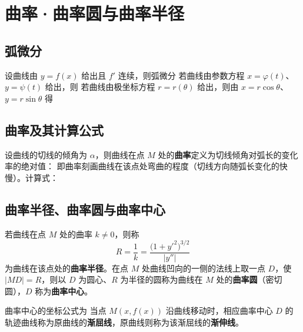 \section{曲率·曲率圆与曲率半径}

\subsection{弧微分}
设曲线由 $y=f(x)$ 给出且 $f'$ 连续，则弧微分
\noindent 若曲线由参数方程 $x=\varphi(t)$、$y=\psi(t)$ 给出，则
\noindent 若曲线由极坐标方程 $r=r(\theta)$ 给出，则由 $x=r\cos\theta$、$y=r\sin\theta$ 得

\subsection{曲率及其计算公式}
设曲线的切线的倾角为 $\alpha$，则曲线在点 $M$ 处的\textbf{曲率}定义为切线倾角对弧长的变化率的绝对值：
\noindent 即曲率刻画曲线在该点处弯曲的程度（切线方向随弧长变化的快慢）。计算式：


\subsection{曲率半径、曲率圆与曲率中心}
若曲线在点 $M$ 处的曲率 $k\neq0$，则称
\[
R=\frac{1}{k}=\frac{\bigl(1+y'^{2}\bigr)^{3/2}}{|y''|}
\]
为曲线在该点处的\textbf{曲率半径}。在点 $M$ 处曲线凹向的一侧的法线上取一点 $D$，使 $|MD|=R$，则以 $D$ 为圆心、$R$ 为半径的圆称为曲线在 $M$ 处的\textbf{曲率圆}（密切圆），$D$ 称为\textbf{曲率中心}。

曲率中心的坐标公式为
\noindent 当点 $M(x,f(x))$ 沿曲线移动时，相应曲率中心 $D$ 的轨迹曲线称为原曲线的\textbf{渐屈线}，原曲线则称为该渐屈线的\textbf{渐伸线}。

